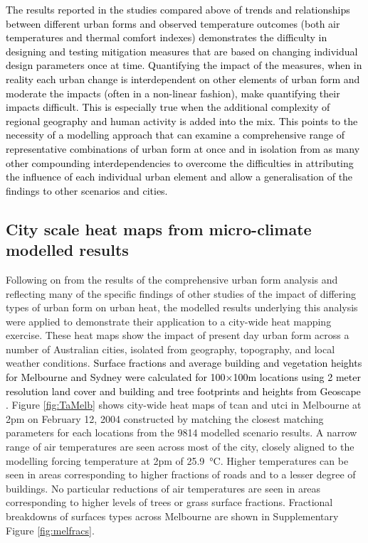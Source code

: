 \documentclass[final,3p,times,authoryear]{elsarticle}
\newcommand{\add}[1]{\textcolor{black}{#1}}
\begin{document}
\add{The results reported in the studies compared above of trends and relationships between different urban forms and observed temperature outcomes (both air temperatures and thermal comfort indexes) demonstrates the difficulty in designing and testing mitigation measures that are based on changing individual design parameters once at time. Quantifying the impact of the measures, when in reality each urban change is interdependent on other elements of urban form and moderate the impacts (often in a non-linear fashion), make quantifying their impacts difficult. This is especially true when the additional complexity of regional geography and human activity is added into the mix. This points to the necessity of a modelling approach that can examine a comprehensive range of representative combinations of urban form at once and in isolation from as many other compounding interdependencies to overcome the difficulties in attributing the influence of each individual urban element and allow a generalisation of the findings to other scenarios and cities.}

\subsection{City scale heat maps from micro-climate modelled results}\label{sec:resultsheatmaps}

Following on from the results of the comprehensive urban form analysis and reflecting many of the specific findings of other studies of the impact of differing types of urban form on urban heat, the modelled results underlying this analysis were applied to demonstrate their application to a city-wide heat mapping exercise. These heat maps show the impact of present day urban form across a number of Australian cities, isolated from geography, topography, and local weather conditions. \add{Surface fractions and average building and vegetation heights for Melbourne and Sydney were calculated for 100$\times$100m locations using 2 meter resolution land cover and building and tree footprints and heights from Geoscape \citep{Geoscape2020}.} Figure \ref{fig:TaMelb} shows city-wide heat maps of \gls{tcan} and \gls{utci} in Melbourne at 2pm on February 12, 2004 constructed by matching the closest matching parameters for each locations from the 9814 modelled scenario results. A narrow range of air temperatures are seen across most of the city, closely aligned to the modelling forcing temperature at 2pm of 25.9\SI{}{\degreeCelsius}. Higher temperatures can be seen in areas corresponding to higher fractions of roads and to a lesser degree of buildings. No particular reductions of air temperatures are seen in areas corresponding to higher levels of trees or grass surface fractions. Fractional breakdowns of surfaces types across Melbourne are shown in Supplementary Figure \ref{fig:melfracs}. 
\end{document}
